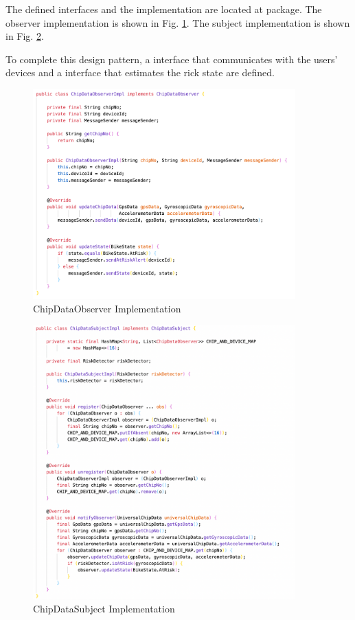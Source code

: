 \documentclass[conference]{IEEEtran}
\begin{document}
The defined interfaces and the implementation are located at  package.
The observer implementation is shown in Fig. \ref{fig:observer}.
The subject implementation is shown in Fig. \ref{fig:subject}.

To complete this design pattern, a  interface that communicates with the users' devices
and a  interface that estimates the rick state are defined.

\begin{figure}[!ht]
	\centering
	\includegraphics[width=0.9\textwidth]{./img/observer-impl.png}
	\caption{ChipDataObserver Implementation}
	\label{fig:observer}
\end{figure}

\begin{figure}[!ht]
	\centering
	\includegraphics[width=0.9\textwidth]{./img/subject-impl.png}
	\caption{ChipDataSubject Implementation}
	\label{fig:subject}
\end{figure}
\end{document}
